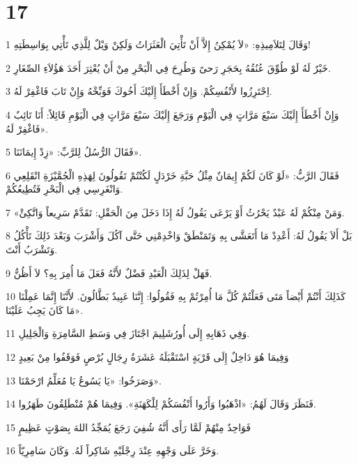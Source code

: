 \chapter{17}

\par 1 وَقَالَ لِتَلاَمِيذِهِ: «لاَ يُمْكِنُ إِلاَّ أَنْ تَأْتِيَ الْعَثَرَاتُ وَلَكِنْ وَيْلٌ لِلَّذِي تَأْتِي بِوَاسِطَتِهِ!
\par 2 خَيْرٌ لَهُ لَوْ طُوِّقَ عُنُقُهُ بِحَجَرِ رَحىً وَطُرِحَ فِي الْبَحْرِ مِنْ أَنْ يُعْثِرَ أَحَدَ هَؤُلاَءِ الصِّغَارِ.
\par 3 اِحْتَرِزُوا لأَنْفُسِكُمْ. وَإِنْ أَخْطَأَ إِلَيْكَ أَخُوكَ فَوَبِّخْهُ وَإِنْ تَابَ فَاغْفِرْ لَهُ.
\par 4 وَإِنْ أَخْطَأَ إِلَيْكَ سَبْعَ مَرَّاتٍ فِي الْيَوْمِ وَرَجَعَ إِلَيْكَ سَبْعَ مَرَّاتٍ فِي الْيَوْمِ قَائِلاً: أَنَا تَائِبٌ فَاغْفِرْ لَهُ».
\par 5 فَقَالَ الرُّسُلُ لِلرَّبِّ: «زِدْ إِيمَانَنَا».
\par 6 فَقَالَ الرَّبُّ: «لَوْ كَانَ لَكُمْ إِيمَانٌ مِثْلُ حَبَّةِ خَرْدَلٍ لَكُنْتُمْ تَقُولُونَ لِهَذِهِ الْجُمَّيْزَةِ انْقَلِعِي وَانْغَرِسِي فِي الْبَحْرِ فَتُطِيعُكُمْ.
\par 7 «وَمَنْ مِنْكُمْ لَهُ عَبْدٌ يَحْرُثُ أَوْ يَرْعَى يَقُولُ لَهُ إِذَا دَخَلَ مِنَ الْحَقْلِ: تَقَدَّمْ سَرِيعاً وَاتَّكِئْ.
\par 8 بَلْ أَلاَ يَقُولُ لَهُ: أَعْدِدْ مَا أَتَعَشَّى بِهِ وَتَمَنْطَقْ وَاخْدِمْنِي حَتَّى آكُلَ وَأَشْرَبَ وَبَعْدَ ذَلِكَ تَأْكُلُ وَتَشْرَبُ أَنْتَ.
\par 9 فَهَلْ لِذَلِكَ الْعَبْدِ فَضْلٌ لأَنَّهُ فَعَلَ مَا أُمِرَ بِهِ؟ لاَ أَظُنُّ.
\par 10 كَذَلِكَ أَنْتُمْ أَيْضاً مَتَى فَعَلْتُمْ كُلَّ مَا أُمِرْتُمْ بِهِ فَقُولُوا: إِنَّنَا عَبِيدٌ بَطَّالُونَ. لأَنَّنَا إِنَّمَا عَمِلْنَا مَا كَانَ يَجِبُ عَلَيْنَا».
\par 11 وَفِي ذَهَابِهِ إِلَى أُورُشَلِيمَ اجْتَازَ فِي وَسَطِ السَّامِرَةِ وَالْجَلِيلِ.
\par 12 وَفِيمَا هُوَ دَاخِلٌ إِلَى قَرْيَةٍ اسْتَقْبَلَهُ عَشَرَةُ رِجَالٍ بُرْصٍ فَوَقَفُوا مِنْ بَعِيدٍ
\par 13 وَصَرَخُوا: «يَا يَسُوعُ يَا مُعَلِّمُ ارْحَمْنَا».
\par 14 فَنَظَرَ وَقَالَ لَهُمُ: «اذْهَبُوا وَأَرُوا أَنْفُسَكُمْ لِلْكَهَنَةِ». وَفِيمَا هُمْ مُنْطَلِقُونَ طَهَرُوا.
\par 15 فَوَاحِدٌ مِنْهُمْ لَمَّا رَأَى أَنَّهُ شُفِيَ رَجَعَ يُمَجِّدُ اللهَ بِصَوْتٍ عَظِيمٍ
\par 16 وَخَرَّ عَلَى وَجْهِهِ عِنْدَ رِجْلَيْهِ شَاكِراً لَهُ. وَكَانَ سَامِرِيّاً.

